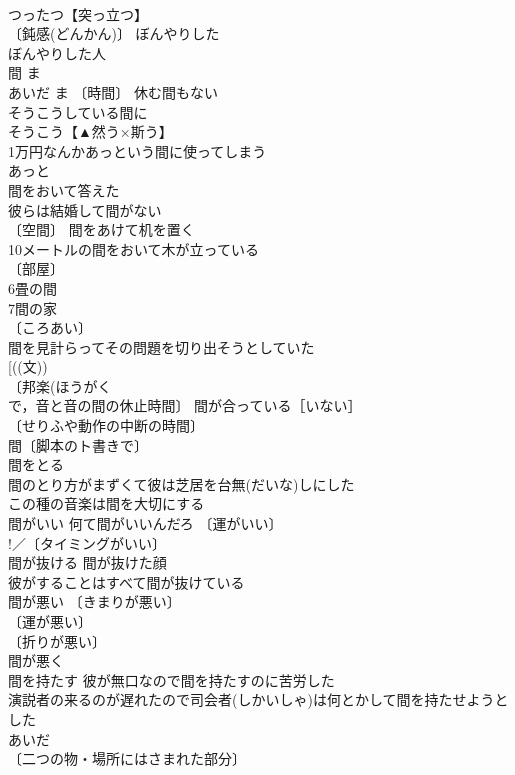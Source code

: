 \documentclass[8pt]{extreport}
\begin{document}
\begin{CJK}{UTF8}{min}
\\	つったつ【突っ立つ】　
\\	〔鈍感(どんかん)〕 ぼんやりした 
\\	ぼんやりした人 
\\	間	ま　
\\	あいだ	ま 〔時間〕 休む間もない 
\\	そうこうしている間に 
\\	そうこう【▲然う×斯う】　
\\	1万円なんかあっという間に使ってしまう 
\\	あっと 
\\	間をおいて答えた 
\\	彼らは結婚して間がない 
\\	〔空間〕 間をあけて机を置く 
\\	10メートルの間をおいて木が立っている 
\\	〔部屋〕
\\	6畳の間 
\\	7間の家 
\\	〔ころあい〕
\\	間を見計らってその問題を切り出そうとしていた 
\\	[((文))
\\	〔邦楽(ほうがく　
\\	で，音と音の間の休止時間〕 間が合っている［いない］ 
\\	〔せりふや動作の中断の時間〕
\\	間〔脚本のト書きで〕 
\\	間をとる 
\\	間のとり方がまずくて彼は芝居を台無(だいな)しにした 
\\	この種の音楽は間を大切にする 
\\	間がいい 何て間がいいんだろ 〔運がいい〕
\\	!／〔タイミングがいい〕
\\	間が抜ける 間が抜けた顔 
\\	彼がすることはすべて間が抜けている 
\\	間が悪い 〔きまりが悪い〕
\\	〔運が悪い〕
\\	〔折りが悪い〕
\\	間が悪く 
\\	間を持たす 彼が無口なので間を持たすのに苦労した 
\\	演説者の来るのが遅れたので司会者(しかいしゃ)は何とかして間を持たせようとした 
\\	あいだ 
\\	〔二つの物・場所にはさまれた部分〕

\end{CJK}
\end{document}
